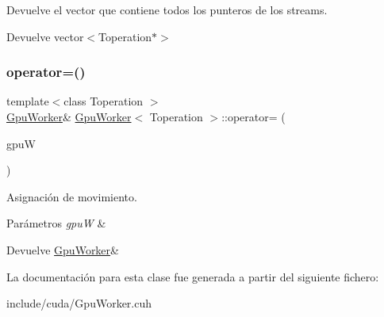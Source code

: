 Devuelve el vector que contiene todos los punteros de los streams. 

\begin{DoxyReturn}{Devuelve}
vector$<$\+Toperation$\ast$$>$ 
\end{DoxyReturn}
\mbox{\label{classGpuWorker_a34d676399244bd965f80f7fc45087bb0}} 
\subsubsection{\texorpdfstring{operator=()}{operator=()}}
{\footnotesize\ttfamily template$<$class Toperation $>$ \\
\hyperlink{classGpuWorker}{Gpu\+Worker}\& \hyperlink{classGpuWorker}{Gpu\+Worker}$<$ Toperation $>$\+::operator= (\begin{DoxyParamCaption}\item[{\hyperlink{classGpuWorker}{Gpu\+Worker}$<$ Toperation $>$ \&\&}]{gpuW }\end{DoxyParamCaption})}



Asignación de movimiento. 


\begin{DoxyParams}{Parámetros}
{\em gpuW} & \\
\hline
\end{DoxyParams}
\begin{DoxyReturn}{Devuelve}
\hyperlink{classGpuWorker}{Gpu\+Worker}\& 
\end{DoxyReturn}


La documentación para esta clase fue generada a partir del siguiente fichero\+:\begin{DoxyCompactItemize}
\item 
include/cuda/Gpu\+Worker.\+cuh\end{DoxyCompactItemize}
